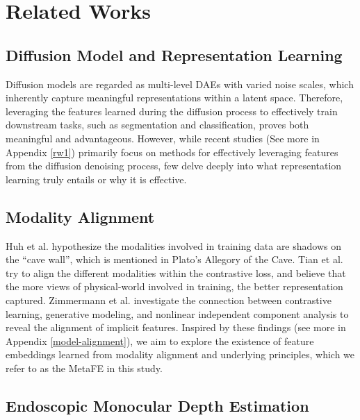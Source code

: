 \section{Related Works}
\subsection{Diffusion Model and Representation Learning}
Diffusion models are regarded as multi-level DAEs with varied noise scales, which inherently capture meaningful representations within a latent space\cite{dif_rep_survey,ldm,INDM,EBM_34,EBM_57,EBM_68}. Therefore, leveraging the features learned during the diffusion process to effectively train downstream tasks\cite{rep_1,rep_2,rep_3,rep_4,rep_5}, such as segmentation and classification, proves both meaningful and advantageous\cite{dif_rep_cla_1,dif_rep_cla_2,dif_rep_cla_2,dif_rep_seg_2,dif_rep_multi_task,dif_rep,dif_rep}. However, while recent studies (See more in Appendix \ref{rw1}) primarily focus on methods for effectively leveraging features from the diffusion denoising process, few delve deeply into what representation learning truly entails or why it is effective.\par   

\subsection{Modality Alignment}
Huh et al. \cite{platonic} hypothesize the modalities involved in training data are shadows on the \enquote{cave wall}, which is mentioned in Plato’s Allegory of the Cave. Tian et al. \cite{real_world_1} try to align the different modalities within the contrastive loss, and believe that the more views of physical-world involved in training, the better representation captured. Zimmermann et al. \cite{real_world_2} investigate the connection between contrastive learning, generative modeling, and nonlinear independent component analysis to reveal the alignment of implicit features. Inspired by these findings (see more in Appendix \ref{model-alignment}), we aim to explore the existence of feature embeddings learned from modality alignment and underlying principles, which we refer to as the MetaFE in this study.\par 

\subsection{Endoscopic Monocular Depth Estimation}

